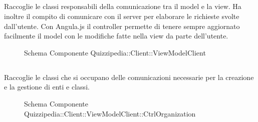 \subsection{}
Raccoglie le classi responsabili della comunicazione tra il model e la view. Ha inoltre il compito di comunicare con il server per elaborare le richieste svolte dall'utente.
Con Angula.js il controller permette di tenere sempre aggiornato facilmente il model con le modifiche fatte nella view da parte dell'utente.
\begin{figure}[H]
\centering
\noindent{}
\caption[Schema Componente Quizzipedia::Client::ViewModelClient]{Schema Componente Quizzipedia::Client::ViewModelClient}
\end{figure}
\subsection{}
Raccoglie le classi che si occupano delle comunicazioni necessarie per la creazione e la gestione di enti e classi.
\begin{figure}[H]
\centering
\noindent{}
\caption[Schema Componente Quizzipedia::Client::ViewModelClient::CtrlOrganization]{Schema Componente Quizzipedia::Client::ViewModelClient::CtrlOrganization}
\end{figure}
